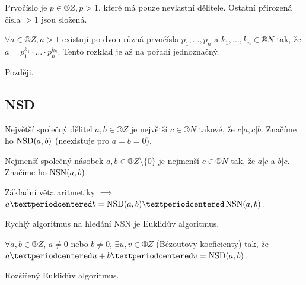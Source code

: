 \documentclass[12pt]{article}                   %
\begin{document}
        \begin{definice}
            Prvočíslo je $p \in ®Z, p > 1$, které má pouze nevlastní dělitele. Ostatní přirozená čísla $>1$ jsou složená.
        \end{definice}

        \begin{veta}
            $\forall a \in ®Z, a > 1$ existují po dvou různá prvočísla $p_1, …, p_n$ a $k_1, …, k_n \in ®N$ tak, že $a = p_1^{k_1}·…·p_n^{k_n}$. Tento rozklad je až na pořadí jednoznačný.

            \begin{dukazin}
                Později.
            \end{dukazin}
        \end{veta}

    \subsection{NSD}
        \begin{definice}
            Největší společný dělitel $a, b \in ®Z$ je největší $c \in ®N$ takové, že $c | a, c|b$. Značíme ho $\operatorname{NSD}(a, b)$ (neexistuje pro $a=b=0$).

            Nejmenší společný násobek $a,b \in ®Z\setminus \{0\}$ je nejmenší $c \in ®N$ tak, že $a | c$ a $b | c$. Značíme ho $\operatorname{NSN}(a, b)$.
        \end{definice}

        \begin{poznamka}
            Základní věta aritmetiky $\implies$ $a·b = \NSD(a, b)·\NSN(a, b)$.

            Rychlý algoritmus na hledání NSN je Euklidův algoritmus.
        \end{poznamka}

        \begin{tvrzeni}
            $\forall a, b \in ®Z$, $a ≠ 0$ nebo $b ≠ 0$, $\exists u, v \in ®Z$ (Bézoutovy koeficienty) tak, že $a·u + b·v = \NSD(a, b)$.

            \begin{dukazin}
                Rozšířený Euklidův algoritmus.
            \end{dukazin}
        \end{tvrzeni}
\end{document}

